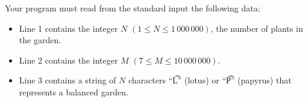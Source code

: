 Your program must read from the standard input the following data:
\begin{itemize}
\item Line 1 contains the integer $N$ $(1 \le N \le 1\,000\,000)$, the number of plants in the garden.
\item Line 2 contains the integer $M$ $(7 \le M \le 10\,000\,000)$.
\item Line 3 contains a string of $N$ characters ``\t{L}'' (lotus) or ``\t{P}'' (papyrus) that represents a balanced garden.
\end{itemize}